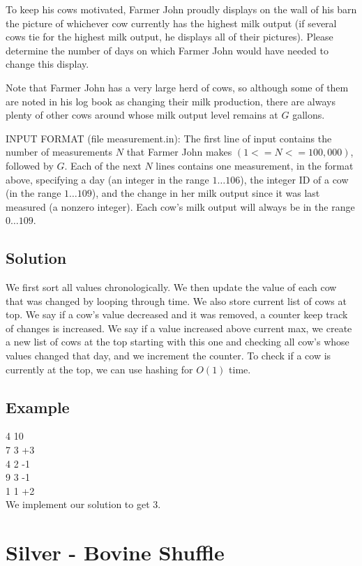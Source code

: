 \documentclass[11pt]{article}
\begin{document}
    To keep his cows motivated, Farmer John proudly displays on the wall of his barn the picture of whichever cow currently has the highest milk output (if several cows tie for the highest milk output, he displays all of their pictures). Please determine the number of days on which Farmer John would have needed to change this display.

    Note that Farmer John has a very large herd of cows, so although some of them are noted in his log book as changing their milk production, there are always plenty of other cows around whose milk output level remains at $G$ gallons.

    INPUT FORMAT (file measurement.in):
    The first line of input contains the number of measurements $N$ that Farmer John makes $(1<=N<=100,000)$, followed by $G$. Each of the next $N$ lines contains one measurement, in the format above, specifying a day (an integer in the range $1…106$), the integer ID of a cow (in the range $1…109$), and the change in her milk output since it was last measured (a nonzero integer). Each cow's milk output will always be in the range $0…109$.
    
    \subsection{Solution}
        We first sort all values chronologically. We then update the value of each cow that was changed by looping through time. We also store current list of cows at top. We say if a cow's value decreased and it was removed, a counter keep track of changes is increased. We say if a value increased above current max, we create a new list of cows at the top starting with this one and checking all cow's whose values changed that day, and we increment the counter. To check if a cow is currently at the top, we can use hashing for $O(1)$ time.
        
    \subsection{Example}
        4 10 \\
        7 3 +3 \\
        4 2 -1 \\
        9 3 -1 \\
        1 1 +2 \\
        
        We implement our solution to get 3.
        
\section{Silver - Bovine Shuffle}
\end{document}
